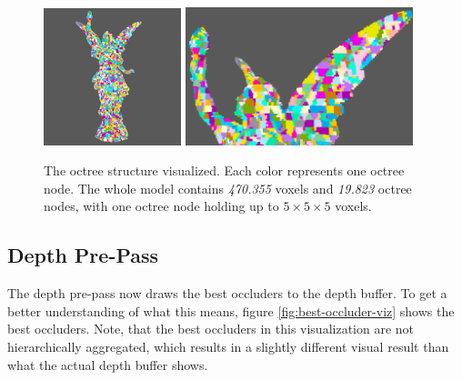 \begin{figure}[h]
    \centering
    \includegraphics[width=151.5px]{images/graphics/lucy-voxel-octree-viz.jpg}
    \includegraphics[width=250px]{images/graphics/lucy-voxel-octree-viz-2.jpg}
    \caption{The octree structure visualized. Each color represents one octree node. The whole model contains 
    \emph{470.355} voxels and \emph{19.823} octree nodes, with one octree node holding up to \begin{math} 5 \times 5 \times 5 \end{math}
    voxels.}
    \label{fig:voxel-octree-viz}
\end{figure}

\subsection*{Depth Pre-Pass}

The depth pre-pass now draws the best occluders to the depth buffer. To get a better understanding of what this 
means, figure \ref{fig:best-occluder-viz} shows the best occluders. Note, that the best occluders in this 
visualization are not hierarchically aggregated, which results in a slightly different visual result than what 
the actual depth buffer shows. 

